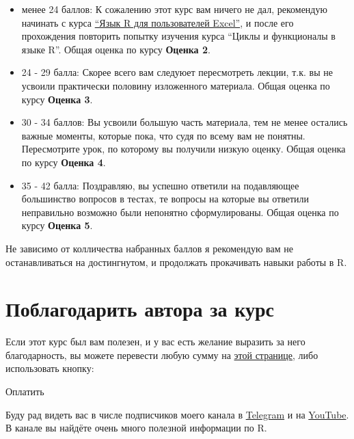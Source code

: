 \documentclass[
]{book}
\providecommand{\tightlist}{%
  \setlength{\itemsep}{0pt}\setlength{\parskip}{0pt}}
\begin{document}
\begin{itemize}
\tightlist
\item
  менее 24 баллов: К сожалению этот курс вам ничего не дал, рекомендую начинать с курса \href{https://alexey-seleznev.pro/r4excel_users/}{``Язык R для пользователей Excel''}, и после его прохождения повторить попытку изучения курса ``Циклы и функционалы в языке R''. Общая оценка по курсу \textbf{Оценка 2}.
\item
  24 - 29 балла: Скорее всего вам следуюет пересмотреть лекции, т.к. вы не усвоили практически половину изложенного материала. Общая оценка по курсу \textbf{Оценка 3}.
\item
  30 - 34 баллов: Вы усвоили большую часть материала, тем не менее остались важные моменты, которые пока, что судя по всему вам не понятны. Пересмотрите урок, по которому вы получили низкую оценку. Общая оценка по курсу \textbf{Оценка 4}.
\item
  35 - 42 балла: Поздравляю, вы успешно ответили на подавляющее большинство вопросов в тестах, те вопросы на которые вы ответили неправильно возможно были непонятно сформулированы. Общая оценка по курсу \textbf{Оценка 5}.
\end{itemize}

Не зависимо от колличества набранных баллов я рекомендую вам не останавливаться на достингнутом, и продолжать прокачивать навыки работы в R.

\hypertarget{ux43fux43eux431ux43bux430ux433ux43eux434ux430ux440ux438ux442ux44c-ux430ux432ux442ux43eux440ux430-ux437ux430-ux43aux443ux440ux441}{%
\section*{Поблагодарить автора за курс}\label{ux43fux43eux431ux43bux430ux433ux43eux434ux430ux440ux438ux442ux44c-ux430ux432ux442ux43eux440ux430-ux437ux430-ux43aux443ux440ux441}}

Если этот курс был вам полезен, и у вас есть желание выразить за него благодарность, вы можете перевести любую сумму на \href{https://secure.wayforpay.com/payment/iteractions_in_r}{этой странице}, либо использовать кнопку:

{Оплатить}

Буду рад видеть вас в числе подписчиков моего канала в \href{https://t.me/R4marketing}{Telegram} и на \href{https://www.youtube.com/R4marketing/?sub_confirmation=1}{YouTube}. В канале вы найдёте очень много полезной информации по R.
\end{document}
